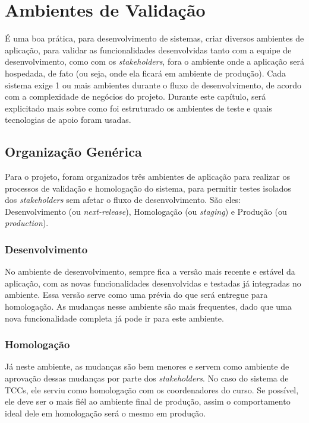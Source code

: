 \section{Ambientes de Validação}
É uma boa prática, para desenvolvimento de sistemas, criar diversos ambientes de aplicação, para validar as funcionalidades desenvolvidas tanto com a equipe de desenvolvimento, como com os \textit{stakeholders}, fora o ambiente onde a aplicação será hospedada, de fato (ou seja, onde ela ficará em ambiente de produção). Cada sistema exige 1 ou mais ambientes durante o fluxo de desenvolvimento, de acordo com a complexidade de negócios do projeto. Durante este capítulo, será explicitado mais sobre como foi estruturado os ambientes de teste e quais tecnologias de apoio foram usadas.

\subsection{Organização Genérica}
Para o projeto, foram organizados três ambientes de aplicação para realizar os processos de validação e homologação do sistema, para permitir testes isolados dos \textit{stakeholders} sem afetar o fluxo de desenvolvimento. São eles: Desenvolvimento (ou \textit{next-release}), Homologação (ou \textit{staging}) e Produção (ou \textit{production})\cite{ilyasabanin2018}.

\subsubsection{Desenvolvimento}
No ambiente de desenvolvimento, sempre fica a versão mais recente e estável da aplicação, com as novas funcionalidades desenvolvidas e testadas já integradas no ambiente. Essa versão serve como uma prévia do que será entregue para homologação. As mudanças nesse ambiente são mais frequentes, dado que uma nova funcionalidade completa já pode ir para este ambiente.

\subsubsection{Homologação}
Já neste ambiente, as mudanças são bem menores e servem como ambiente de aprovação dessas mudanças por parte dos \textit{stakeholders}. No caso do sistema de TCCs, ele serviu como homologação com os coordenadores do curso. Se possível, ele deve ser o mais fiél ao ambiente final de produção, assim o comportamento ideal dele em homologação será o mesmo em produção.


